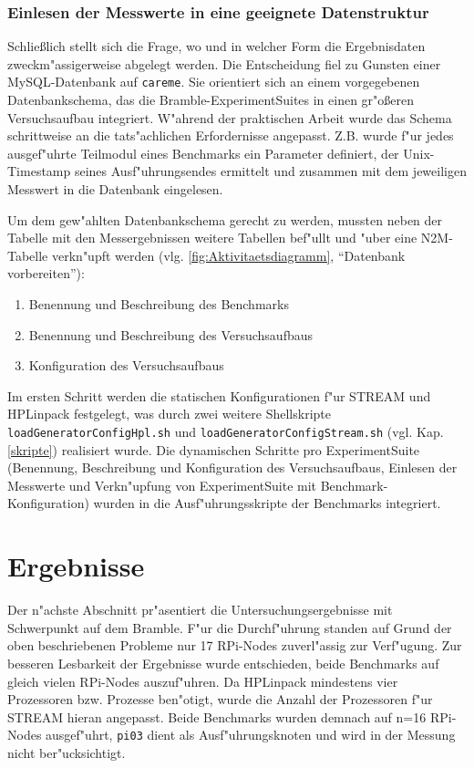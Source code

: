 \subsubsection{Einlesen der Messwerte in eine geeignete Datenstruktur}

Schlie\ss lich stellt sich die Frage, wo und in welcher Form die Ergebnisdaten zweckm"assigerweise abgelegt werden. Die Entscheidung fiel zu Gunsten einer MySQL-Datenbank auf \texttt{careme}. Sie orientiert sich an einem vorgegebenen Datenbankschema, das die Bramble-ExperimentSuites in einen gr"o\ss eren Versuchsaufbau integriert. W"ahrend der praktischen Arbeit wurde das Schema schrittweise an die tats"achlichen Erfordernisse angepasst. Z.B. wurde f"ur jedes ausgef"uhrte Teilmodul eines Benchmarks ein Parameter definiert, der Unix-Timestamp seines Ausf"uhrungsendes ermittelt und zusammen mit dem jeweiligen Messwert in die Datenbank eingelesen.

Um dem gew"ahlten Datenbankschema gerecht zu werden, mussten neben der Tabelle mit den Messergebnissen weitere Tabellen bef"ullt und "uber eine N2M-Tabelle verkn"upft werden (vlg. \ref{fig:Aktivitaetsdiagramm}, "`Datenbank vorbereiten"'): 
\begin{enumerate}
	\item Benennung und Beschreibung des Benchmarks 
	\item Benennung und Beschreibung des Versuchsaufbaus 
	\item Konfiguration des Versuchsaufbaus 
\end{enumerate} 
Im ersten Schritt werden die statischen Konfigurationen f"ur STREAM und HPLinpack festgelegt, was durch zwei weitere Shellskripte \texttt{loadGeneratorConfigHpl.sh} und \texttt{loadGenerator\-ConfigStream.sh} (vgl. Kap. \ref{skripte}) realisiert wurde. Die dynamischen Schritte pro ExperimentSuite (Benennung, Beschreibung und Konfiguration des Versuchsaufbaus, Einlesen der Messwerte und Verkn"upfung von ExperimentSuite mit Benchmark-Konfiguration) wurden in die Ausf"uhrungsskripte der Benchmarks integriert. 

\section{Ergebnisse}\label{Ergebnisse}

Der n"achste Abschnitt pr"asentiert die Untersuchungsergebnisse mit Schwerpunkt auf dem Bramble. F"ur die Durchf"uhrung standen auf Grund der oben beschriebenen Probleme nur 17 RPi-Nodes zuverl"assig zur Verf"ugung. Zur besseren Lesbarkeit der Ergebnisse wurde entschieden, beide Benchmarks auf gleich vielen RPi-Nodes auszuf"uhren. Da HPLinpack mindestens vier Prozessoren bzw. Prozesse ben"otigt, wurde die Anzahl der Prozessoren f"ur STREAM hieran angepasst. Beide Benchmarks wurden demnach auf n=16 RPi-Nodes ausgef"uhrt, \texttt{pi03} dient als Ausf"uhr\-ungsknoten und wird in der Messung nicht ber"ucksichtigt.

